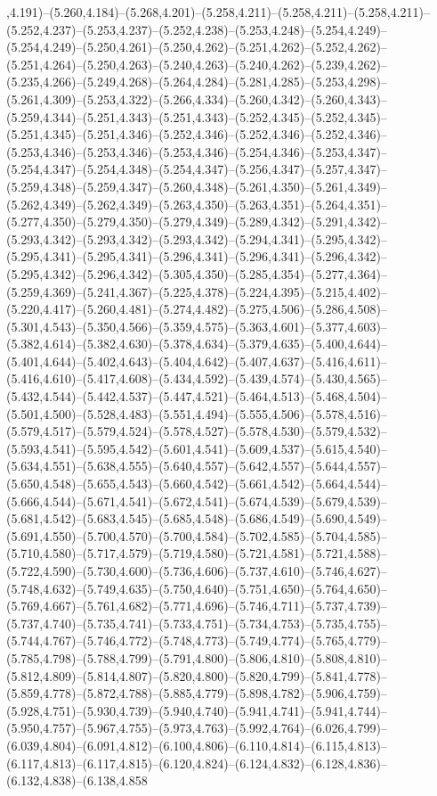 ,4.191)--(5.260,4.184)--(5.268,4.201)--(5.258,4.211)--(5.258,4.211)--(5.258,4.211)--(5.252,4.237)--(5.253,4.237)--(5.252,4.238)--(5.253,4.248)--(5.254,4.249)--(5.254,4.249)--(5.250,4.261)--(5.250,4.262)--(5.251,4.262)--(5.252,4.262)--(5.251,4.264)--(5.250,4.263)--(5.240,4.263)--(5.240,4.262)--(5.239,4.262)--(5.235,4.266)--(5.249,4.268)--(5.264,4.284)--(5.281,4.285)--(5.253,4.298)--(5.261,4.309)--(5.253,4.322)--(5.266,4.334)--(5.260,4.342)--(5.260,4.343)--(5.259,4.344)--(5.251,4.343)--(5.251,4.343)--(5.252,4.345)--(5.252,4.345)--(5.251,4.345)--(5.251,4.346)--(5.252,4.346)--(5.252,4.346)--(5.252,4.346)--(5.253,4.346)--(5.253,4.346)--(5.253,4.346)--(5.254,4.346)--(5.253,4.347)--(5.254,4.347)--(5.254,4.348)--(5.254,4.347)--(5.256,4.347)--(5.257,4.347)--(5.259,4.348)--(5.259,4.347)--(5.260,4.348)--(5.261,4.350)--(5.261,4.349)--(5.262,4.349)--(5.262,4.349)--(5.263,4.350)--(5.263,4.351)--(5.264,4.351)--(5.277,4.350)--(5.279,4.350)--(5.279,4.349)--(5.289,4.342)--(5.291,4.342)--(5.293,4.342)--(5.293,4.342)--(5.293,4.342)--(5.294,4.341)--(5.295,4.342)--(5.295,4.341)--(5.295,4.341)--(5.296,4.341)--(5.296,4.341)--(5.296,4.342)--(5.295,4.342)--(5.296,4.342)--(5.305,4.350)--(5.285,4.354)--(5.277,4.364)--(5.259,4.369)--(5.241,4.367)--(5.225,4.378)--(5.224,4.395)--(5.215,4.402)--(5.220,4.417)--(5.260,4.481)--(5.274,4.482)--(5.275,4.506)--(5.286,4.508)--(5.301,4.543)--(5.350,4.566)--(5.359,4.575)--(5.363,4.601)--(5.377,4.603)--(5.382,4.614)--(5.382,4.630)--(5.378,4.634)--(5.379,4.635)--(5.400,4.644)--(5.401,4.644)--(5.402,4.643)--(5.404,4.642)--(5.407,4.637)--(5.416,4.611)--(5.416,4.610)--(5.417,4.608)--(5.434,4.592)--(5.439,4.574)--(5.430,4.565)--(5.432,4.544)--(5.442,4.537)--(5.447,4.521)--(5.464,4.513)--(5.468,4.504)--(5.501,4.500)--(5.528,4.483)--(5.551,4.494)--(5.555,4.506)--(5.578,4.516)--(5.579,4.517)--(5.579,4.524)--(5.578,4.527)--(5.578,4.530)--(5.579,4.532)--(5.593,4.541)--(5.595,4.542)--(5.601,4.541)--(5.609,4.537)--(5.615,4.540)--(5.634,4.551)--(5.638,4.555)--(5.640,4.557)--(5.642,4.557)--(5.644,4.557)--(5.650,4.548)--(5.655,4.543)--(5.660,4.542)--(5.661,4.542)--(5.664,4.544)--(5.666,4.544)--(5.671,4.541)--(5.672,4.541)--(5.674,4.539)--(5.679,4.539)--(5.681,4.542)--(5.683,4.545)--(5.685,4.548)--(5.686,4.549)--(5.690,4.549)--(5.691,4.550)--(5.700,4.570)--(5.700,4.584)--(5.702,4.585)--(5.704,4.585)--(5.710,4.580)--(5.717,4.579)--(5.719,4.580)--(5.721,4.581)--(5.721,4.588)--(5.722,4.590)--(5.730,4.600)--(5.736,4.606)--(5.737,4.610)--(5.746,4.627)--(5.748,4.632)--(5.749,4.635)--(5.750,4.640)--(5.751,4.650)--(5.764,4.650)--(5.769,4.667)--(5.761,4.682)--(5.771,4.696)--(5.746,4.711)--(5.737,4.739)--(5.737,4.740)--(5.735,4.741)--(5.733,4.751)--(5.734,4.753)--(5.735,4.755)--(5.744,4.767)--(5.746,4.772)--(5.748,4.773)--(5.749,4.774)--(5.765,4.779)--(5.785,4.798)--(5.788,4.799)--(5.791,4.800)--(5.806,4.810)--(5.808,4.810)--(5.812,4.809)--(5.814,4.807)--(5.820,4.800)--(5.820,4.799)--(5.841,4.778)--(5.859,4.778)--(5.872,4.788)--(5.885,4.779)--(5.898,4.782)--(5.906,4.759)--(5.928,4.751)--(5.930,4.739)--(5.940,4.740)--(5.941,4.741)--(5.941,4.744)--(5.950,4.757)--(5.967,4.755)--(5.973,4.763)--(5.992,4.764)--(6.026,4.799)--(6.039,4.804)--(6.091,4.812)--(6.100,4.806)--(6.110,4.814)--(6.115,4.813)--(6.117,4.813)--(6.117,4.815)--(6.120,4.824)--(6.124,4.832)--(6.128,4.836)--(6.132,4.838)--(6.138,4.858